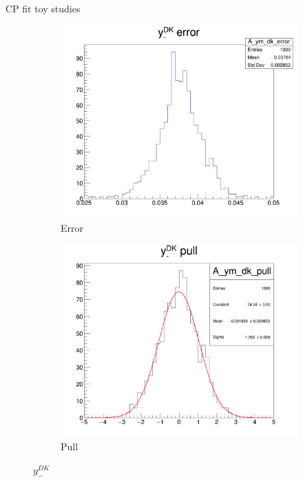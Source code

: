 \documentclass{beamer}
\begin{document}
\begin{frame}{CP fit toy studies}
\begin{figure}
\begin{subfigure}{0.25\textwidth}
    \end{subfigure}%
    \begin{subfigure}{0.25\textwidth}
      \includegraphics[width = 1.0\textwidth]{Plots/A_ym_dk_error.png}
      \caption{Error}
    \end{subfigure}%
    \begin{subfigure}{0.25\textwidth}
      \includegraphics[width = 1.0\textwidth]{Plots/A_ym_dk_pull.png}
      \caption{Pull}
    \end{subfigure}
    \caption{$y_-^{DK}$}
  \end{figure}
\end{frame}
\end{document}
